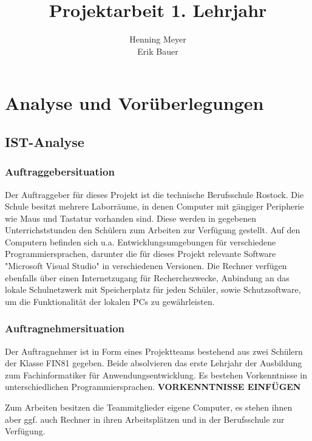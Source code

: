 \documentclass{article}
\title{Projektarbeit 1. Lehrjahr}
\author{Henning Meyer\\Erik Bauer}
\begin{document}

\maketitle
\newpage
\tableofcontents
\newpage


\section{Analyse und Vorüberlegungen}

\subsection{IST-Analyse}

\subsubsection{Auftraggebersituation}

	Der Auftraggeber für dieses Projekt ist die technische Berufsschule Rostock. Die Schule besitzt mehrere Laborräume, in denen Computer mit gängiger Peripherie wie Maus und Tastatur vorhanden sind. Diese werden in gegebenen Unterrichststunden den Schülern zum Arbeiten zur Verfügung gestellt.
	Auf den Computern befinden sich u.a. Entwicklungsumgebungen für verschiedene Programmiersprachen, darunter die für dieses Projekt relevante Software "Microsoft Visual Studio" in verschiedenen Versionen. Die Rechner verfügen ebenfalls über einen Internetzugang für Recherchezwecke, Anbindung an das lokale Schulnetzwerk mit Speicherplatz für jeden Schüler, sowie Schutzsoftware, um die Funktionalität der lokalen PCs zu gewährleisten.
	
\subsubsection{Auftragnehmersituation}

	Der Auftragnehmer ist in Form eines Projektteams bestehend aus zwei Schülern der Klasse FIN81 gegeben. Beide absolvieren das erste Lehrjahr der Ausbildung zum Fachinformatiker für Anwendungsentwicklung. Es bestehen Vorkenntnisse in unterschiedlichen Programmiersprachen. 
	\textbf{VORKENNTNISSE EINFÜGEN}%
	
	Zum Arbeiten besitzen die Teammitglieder  eigene Computer, es stehen ihnen aber ggf. auch Rechner in ihren Arbeitsplätzen und in der Berufsschule zur Verfügung.
\end{document}
